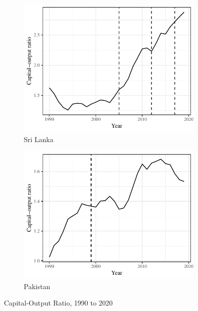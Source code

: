 \begin{figure}[t]
    \centering
    \begin{subfigure}[position]{0.49\textwidth}
        \centering
        \includegraphics[width=\textwidth]{fig/sri_lanka_output_loss.pdf}
        \caption{Sri Lanka}
        \label{fig: sri-lanka-ky}
    \end{subfigure}
    \begin{subfigure}[position]{0.49\textwidth}
        \centering
        \includegraphics[width = \textwidth]{fig/pakistan_output_loss.pdf}
        \caption{Pakistan}
        \label{fig: pakistan-ky}
    \end{subfigure}
    \caption{Capital-Output Ratio, 1990 to 2020}
    \label{fig: LAK-PAK-ky}
\end{figure}